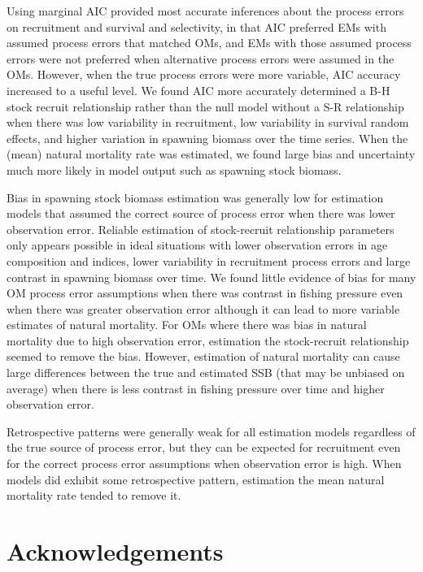 \documentclass[
  12pt,
]{article}
\begin{document}
Using marginal AIC provided most accurate inferences about the process
errors on recruitment and survival and selectivity, in that AIC
preferred EMs with assumed process errors that matched OMs, and EMs with
those assumed process errors were not preferred when alternative process
errors were assumed in the OMs. However, when the true process errors
were more variable, AIC accuracy increased to a useful level. We found
AIC more accurately determined a B-H stock recruit relationship rather
than the null model without a S-R relationship when there was low
variability in recruitment, low variability in survival random effects,
and higher variation in spawning biomass over the time series. When the
(mean) natural mortality rate was estimated, we found large bias and
uncertainty much more likely in model output such as spawning stock
biomass.

Bias in spawning stock biomass estimation was generally low for
estimation models that assumed the correct source of process error when
there was lower observation error. Reliable estimation of stock-recruit
relationship parameters only appears possible in ideal situations with
lower observation errors in age composition and indices, lower
variability in recruitment process errors and large contrast in spawning
biomass over time. We found little evidence of bias for many OM process
error assumptions when there was contrast in fishing pressure even when
there was greater observation error although it can lead to more
variable estimates of natural mortality. For OMs where there was bias in
natural mortality due to high observation error, estimation the
stock-recruit relationship seemed to remove the bias. However,
estimation of natural mortality can cause large differences between the
true and estimated SSB (that may be unbiased on average) when there is
less contrast in fishing pressure over time and higher observation
error.

Retrospective patterns were generally weak for all estimation models
regardless of the true source of process error, but they can be expected
for recruitment even for the correct process error assumptions when
observation error is high. When models did exhibit some retrospective
pattern, estimation the mean natural mortality rate tended to remove it.

\hypertarget{acknowledgements}{%
\section*{Acknowledgements}\label{acknowledgements}}
\end{document}
